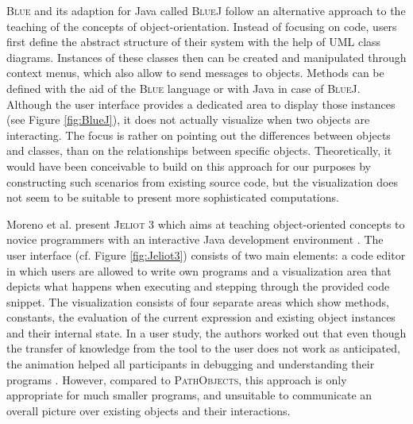 \textsc{Blue} \cite{kolling_object-oriented_1996, kolling_blue_1996} and its adaption for Java called \textsc{BlueJ} \cite{kolling_bluej_2003} follow an alternative approach to the teaching of the concepts of object-orientation.
Instead of focusing on code, users first define the abstract structure of their system with the help of UML class diagrams.
Instances of these classes then can be created and manipulated through  context menus, which also allow to send messages to objects.
Methods can be defined with the aid of the \textsc{Blue} language or with Java in case of \textsc{BlueJ}.
Although the user interface provides a dedicated area to display those instances (see Figure \ref{fig:BlueJ}), it does not actually visualize when two objects are interacting.
The focus is rather on pointing out the differences  between objects and classes, than on the relationships between specific objects.
Theoretically, it would have been conceivable to build on this approach for our purposes by constructing such scenarios from existing source code, but the visualization does not seem to be suitable to present more sophisticated computations.

Moreno et al. present \textsc{Jeliot 3} which aims at teaching object-oriented concepts to novice programmers with an interactive Java development environment \cite{moreno_visualizing_2004, bednarik_jeliot_2005}.
The user interface (cf. Figure \ref{fig:Jeliot3}) consists of two main elements: a code editor in which users are allowed to write own programs and a visualization area that depicts what happens when executing and stepping through the provided code snippet.
The visualization consists of four separate areas which show methods, constants, the evaluation of the current expression and existing object instances and their internal state.
In a user study, the authors worked out that even though the transfer of knowledge from the tool to the user does not work as anticipated, the animation helped all participants in debugging and understanding their programs \cite{moreno_jeliot_2007}.
However, compared to \textsc{PathObjects}, this approach is only appropriate for much smaller programs, and unsuitable to communicate an overall picture over existing objects and their interactions.